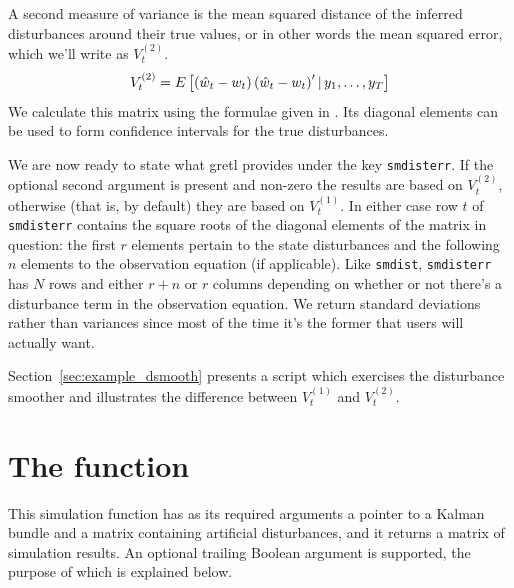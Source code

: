 A second measure of variance is the mean squared distance of the
inferred disturbances around their true values, or in other words the
mean squared error, which we'll write as $V^{(2)}_t$.
\[
V^{(2)}_t = E\left[\left(\hat{w}_t - w_t\right)
  \left(\hat{w}_t - w_t\right)'
  | \,y_1, \ldots, y_T \right]
\]
We calculate this matrix using the formulae given in \citet[section
4.5.2]{durbin-koopman12}. Its diagonal elements can be used to form
confidence intervals for the true disturbances.

We are now ready to state what gretl provides under the key
\texttt{smdisterr}. If the optional second argument is present and
non-zero the results are based on $V^{(2)}_t$, otherwise (that is, by
default) they are based on $V^{(1)}_t$. In either case row $t$ of
\texttt{smdisterr} contains the square roots of the diagonal elements
of the matrix in question: the first $r$ elements pertain to the state
disturbances and the following $n$ elements to the observation
equation (if applicable). Like \texttt{smdist}, \texttt{smdisterr} has
$N$ rows and either $r+n$ or $r$ columns depending on whether or not
there's a disturbance term in the observation equation. We return
standard deviations rather than variances since most of the time
it's the former that users will actually want.

Section~\ref{sec:example_dsmooth} presents a script which exercises
the disturbance smoother and illustrates the difference between
$V^{(1)}_t$ and $V^{(2)}_t$.

\section{The  function}
\label{sec:ksimul}

This simulation function has as its required arguments a pointer to a
Kalman bundle and a matrix containing artificial disturbances, and it
returns a matrix of simulation results. An optional trailing Boolean
argument is supported, the purpose of which is explained below.

